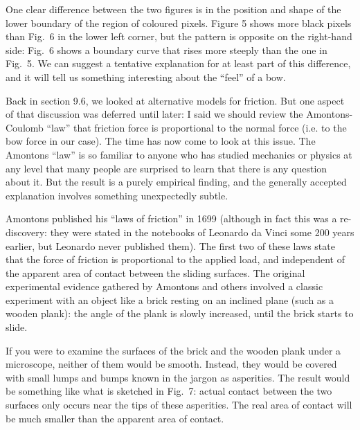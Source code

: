   One clear difference between the two figures is in the position and shape of 
  the lower boundary of the region of coloured pixels. Figure 5 shows more 
  black pixels than Fig.\ 6 in the lower left corner, but the pattern is 
  opposite on the right-hand side: Fig.\ 6 shows a boundary curve that rises 
  more steeply than the one in Fig.\ 5. We can suggest a tentative explanation 
  for at least part of this difference, and it will tell us something 
  interesting about the “feel” of a bow. 

  Back in section 9.6, we looked at alternative models for friction. But one 
  aspect of that discussion was deferred until later: I said we should review 
  the Amontons-Coulomb “law” that friction force is proportional to the normal 
  force (i.e. to the bow force in our case). The time has now come to look at 
  this issue. The Amontons “law” is so familiar to anyone who has studied 
  mechanics or physics at any level that many people are surprised to learn 
  that there is any question about it. But the result is a purely empirical 
  finding, and the generally accepted explanation involves something 
  unexpectedly subtle. 

  Amontons published his “laws of friction” in 1699 (although in fact this was 
  a re-discovery: they were stated in the notebooks of Leonardo da Vinci some 
  200 years earlier, but Leonardo never published them). The first two of these 
  laws state that the force of friction is proportional to the applied load, 
  and independent of the apparent area of contact between the sliding surfaces. 
  The original experimental evidence gathered by Amontons and others involved a 
  classic experiment with an object like a brick resting on an inclined plane 
  (such as a wooden plank): the angle of the plank is slowly increased, until 
  the brick starts to slide. 

  If you were to examine the surfaces of the brick and the wooden plank under a 
  microscope, neither of them would be smooth. Instead, they would be covered 
  with small lumps and bumps known in the jargon as asperities. The result 
  would be something like what is sketched in Fig.\ 7: actual contact between 
  the two surfaces only occurs near the tips of these asperities. The real area 
  of contact will be much smaller than the apparent area of contact. 

